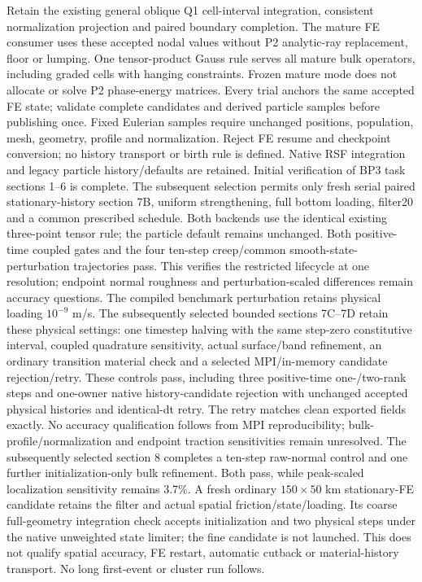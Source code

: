 \documentclass[11pt]{article}
\begin{document}
Retain the existing general oblique Q1 cell-interval integration, consistent
normalization projection and paired boundary completion. The mature FE
consumer uses these accepted nodal values without P2 analytic-ray replacement,
floor or lumping. One tensor-product Gauss rule serves all mature bulk operators,
including graded cells with hanging constraints. Frozen mature mode does not
allocate or solve P2 phase-energy matrices. Every trial anchors the same
accepted FE state; validate complete candidates and derived particle samples
before publishing once. Fixed Eulerian samples require unchanged positions,
population, mesh, geometry, profile and normalization. Reject FE resume and
checkpoint conversion; no history transport or birth rule is defined. Native
RSF integration and legacy particle history/defaults are retained. Initial
verification of BP3 task sections 1--6 is complete. The subsequent selection
permits only fresh serial paired stationary-history section 7B, uniform
strengthening, full bottom loading, filter20 and a common prescribed schedule.
Both backends use the identical existing three-point tensor rule; the particle
default remains unchanged. Both positive-time coupled gates and the four
ten-step creep/common smooth-state-perturbation trajectories pass. This verifies
the restricted lifecycle at one resolution; endpoint normal roughness and
perturbation-scaled differences remain accuracy questions. The compiled benchmark
perturbation retains physical loading $10^{-9}$ m/s. The subsequently selected
bounded sections 7C--7D retain these physical settings: one timestep halving
with the same step-zero constitutive interval, coupled quadrature sensitivity,
actual surface/band refinement, an ordinary transition material check and a
selected MPI/in-memory candidate rejection/retry. These controls pass, including
three positive-time one-/two-rank steps and one-owner native history-candidate
rejection with unchanged accepted physical histories and identical-dt retry.
The retry matches clean exported fields exactly. No accuracy qualification follows
from MPI reproducibility; bulk-profile/normalization and endpoint traction
sensitivities remain unresolved. The subsequently selected section 8 completes
a ten-step raw-normal control and one further initialization-only bulk refinement.
Both pass, while peak-scaled localization sensitivity remains 3.7\%.
A fresh ordinary $150\times50$ km stationary-FE candidate retains the filter
and actual spatial friction/state/loading. Its coarse full-geometry integration
check accepts initialization and two physical steps under the native unweighted
state limiter; the fine candidate is not launched. This does not qualify spatial
accuracy, FE restart, automatic cutback or material-history transport.
No long first-event or cluster run follows.
\end{document}

